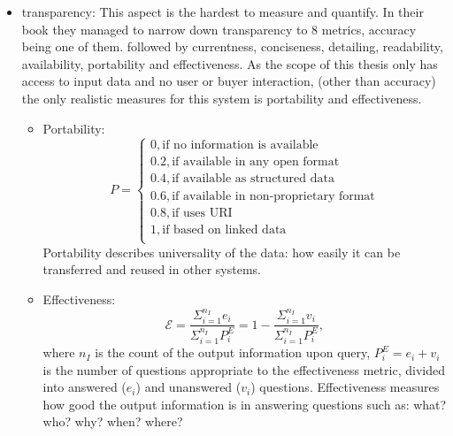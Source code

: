 \documentclass[a4paper,11pt]{report} %
\theoremstyle{change}
\theoremstyle{theoremstyle}
\begin{document}
\begin{itemize}
    \item transparency: This aspect is the hardest to measure and quantify. In their book  \cite{spagnuelo2016metrics} they managed to narrow down transparency to 8 metrics, accuracy being one of them. followed by currentness, conciseness, detailing, readability, availability, portability and effectiveness. As the scope of this thesis only has access to input data and no user or buyer interaction, (other than accuracy) the only realistic measures for this system is portability and effectiveness. %
    \begin{itemize}
        \item Portability:
        \begin{equation*}
            P = \begin{cases}
                0, \text{if no information is available}\\
                0.2, \text{if available in any open format}\\
                0.4, \text{if available as structured data}\\
                0.6, \text{if available in non-proprietary format}\\
                0.8, \text{if uses URI}\\
                1, \text{if based on linked data}\\
            \end{cases}
        \end{equation*}
        Portability describes universality of the data: how easily it can be transferred and reused in other systems.
        \item Effectiveness:
        \begin{equation*}
            \mathcal{E} = \frac{\Sigma^{n_I}_{i=1}e_i}{\Sigma^{n_I}_{i=1}P^E_i} = 1 - \frac{\Sigma^{n_I}_{i=1}v_i}{\Sigma^{n_I}_{i=1}P^E_i},
        \end{equation*}
        where $n_I$ is the count of the output information upon query, $P^E_i = e_i + v_i$ is the number of questions appropriate to the effectiveness metric, divided into answered ($e_i$) and unanswered ($v_i$) questions.
        Effectiveness measures how good the output information is in answering questions such as: what? who? why? when? where?
    \end{itemize}
\end{itemize}
\end{document}
